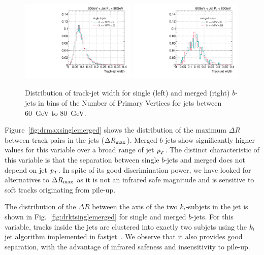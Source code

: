 \begin{figure}[tp]
\centering
\includegraphics[width=0.49\textwidth]{FIGS/systematics/trkWidthsingle_060.pdf}
\includegraphics[width=0.49\textwidth]{FIGS/systematics/trkWidthmerged_060.pdf}
\caption{Distribution of track-jet width for single (left) and merged (right) $b$-jets in bins of the Number of Primary Vertices for jets between 60~GeV to 80~GeV.}
\label{fig:trkwidthpileup}
\end{figure}


Figure~\ref{fig:drmaxsinglemerged} shows the distribution of the maximum $\Delta R$ between track pairs in the jets ($\Delta R_{\rm max}$). Merged $b$-jets show significantly higher values for this variable over a broad range of jet ${\emph{p}_{T}}$. The distinct characteristic of this variable is that the separation between single $b$-jets and merged does not depend on jet ${\emph{p}_{T}}$. In spite of its good discrimination power, we have looked for alternatives to $\Delta R_{\rm max}$ as it is not an infrared safe magnitude and is sensitive to soft tracks originating from pile-up. 

The distribution of the $\Delta R$ between the axis of the two $k_t$-subjets in the jet is shown in Fig.~\ref{fig:drktsinglemerged} for single and merged $b$-jets. For this variable, tracks inside the jets are clustered into exactly two subjets using the $k_t$ jet algorithm implemented in fastjet~\cite{fastjet}. We observe that it also provides good separation, with the advantage of infrared safeness and insensitivity to pile-up. %

